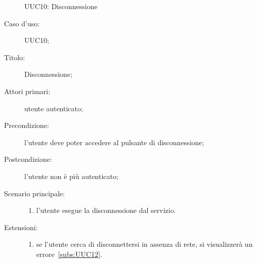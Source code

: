 \documentclass[../../../analisi-dei-requisiti.tex]{subfiles}
\begin{document}
\begin{figure}[H]
  \centering
  \caption{UUC10: Disconnessione}%
  \label{fig:UUC10}
\end{figure}

  \begin{description}
  \item[Caso d’uso:] UUC10;
  \item[Titolo:] Disconnessione;
  \item[Attori primari:] utente autenticato;
  \item[Precondizione:] l'utente deve poter accedere al pulsante di disconnessione;
  \item[Postcondizione:] l'utente non è più autenticato;
  \item[Scenario principale:]
        \begin{enumerate}
          \item l'utente esegue la disconnessione dal servizio.
        \end{enumerate}
  \item[Estensioni:]
        \begin{enumerate}
          \item se l'utente cerca di disconnettersi in assenza di rete, si visualizzerà un errore~\ref{subs:UUC12}.
        \end{enumerate}
\end{description}
\end{document}
